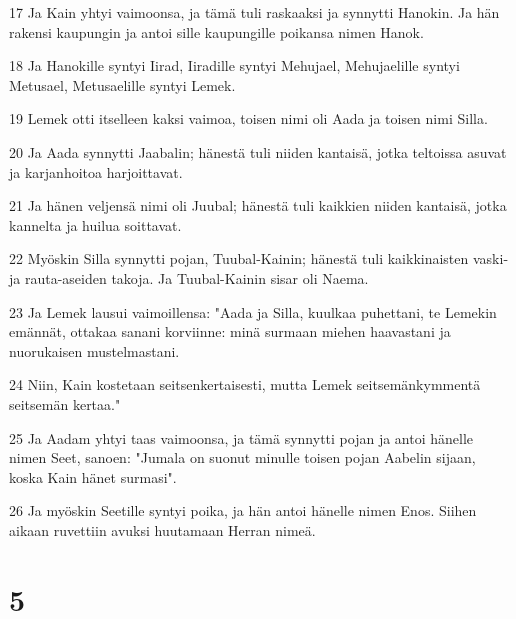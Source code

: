 \par 17 Ja Kain yhtyi vaimoonsa, ja tämä tuli raskaaksi ja synnytti Hanokin. Ja hän rakensi kaupungin ja antoi sille kaupungille poikansa nimen Hanok.
\par 18 Ja Hanokille syntyi Iirad, Iiradille syntyi Mehujael, Mehujaelille syntyi Metusael, Metusaelille syntyi Lemek.
\par 19 Lemek otti itselleen kaksi vaimoa, toisen nimi oli Aada ja toisen nimi Silla.
\par 20 Ja Aada synnytti Jaabalin; hänestä tuli niiden kantaisä, jotka teltoissa asuvat ja karjanhoitoa harjoittavat.
\par 21 Ja hänen veljensä nimi oli Juubal; hänestä tuli kaikkien niiden kantaisä, jotka kannelta ja huilua soittavat.
\par 22 Myöskin Silla synnytti pojan, Tuubal-Kainin; hänestä tuli kaikkinaisten vaski- ja rauta-aseiden takoja. Ja Tuubal-Kainin sisar oli Naema.
\par 23 Ja Lemek lausui vaimoillensa: "Aada ja Silla, kuulkaa puhettani, te Lemekin emännät, ottakaa sanani korviinne: minä surmaan miehen haavastani ja nuorukaisen mustelmastani.
\par 24 Niin, Kain kostetaan seitsenkertaisesti, mutta Lemek seitsemänkymmentä seitsemän kertaa."
\par 25 Ja Aadam yhtyi taas vaimoonsa, ja tämä synnytti pojan ja antoi hänelle nimen Seet, sanoen: "Jumala on suonut minulle toisen pojan Aabelin sijaan, koska Kain hänet surmasi".
\par 26 Ja myöskin Seetille syntyi poika, ja hän antoi hänelle nimen Enos. Siihen aikaan ruvettiin avuksi huutamaan Herran nimeä.

\chapter{5}

